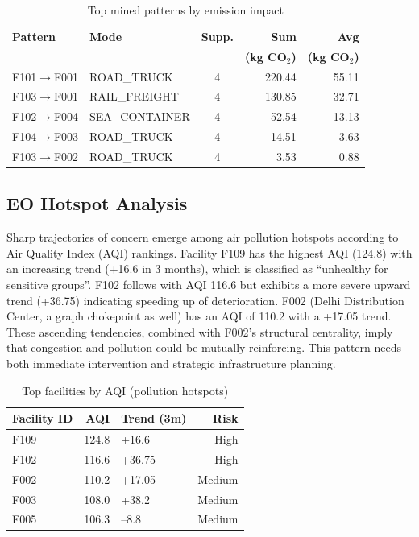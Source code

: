 \documentclass[conference]{IEEEtran}
\begin{document}
\begin{table}[!t]
\centering
\caption{Top mined patterns by emission impact}
\footnotesize
\begin{tabular}{@{}p{2.2cm}@{}p{1.8cm}@{}c@{}r@{}r@{}}
\toprule
\textbf{Pattern} & \textbf{Mode} & \textbf{Supp.} & \textbf{Sum} & \textbf{Avg} \\
&  &  & \textbf{(kg CO$_2$)} & \textbf{(kg CO$_2$)} \\
\midrule
F101$\to$F001 & ROAD\_TRUCK & 4 & 220.44 & 55.11 \\
F103$\to$F001 & RAIL\_FREIGHT & 4 & 130.85 & 32.71 \\
F102$\to$F004 & SEA\_CONTAINER & 4 & 52.54 & 13.13 \\
F104$\to$F003 & ROAD\_TRUCK & 4 & 14.51 & 3.63 \\
F103$\to$F002 & ROAD\_TRUCK & 4 & 3.53 & 0.88 \\
\bottomrule
\end{tabular}
\label{tab:prefixspan}
\end{table}

\subsection{EO Hotspot Analysis}
Sharp trajectories of concern emerge among air pollution hotspots according to Air Quality Index (AQI) rankings. Facility F109 has the highest AQI (124.8) with an increasing trend (+16.6 in 3 months), which is classified as ``unhealthy for sensitive groups''. F102 follows with AQI 116.6 but exhibits a more severe upward trend (+36.75) indicating speeding up of deterioration. F002 (Delhi Distribution Center, a graph chokepoint as well) has an AQI of 110.2 with a +17.05 trend. These ascending tendencies, combined with F002's structural centrality, imply that congestion and pollution could be mutually reinforcing. This pattern needs both immediate intervention and strategic infrastructure planning.

\begin{table}[!t]
\centering
\caption{Top facilities by AQI (pollution hotspots)}
\small
\begin{tabular}{@{}lrlr@{}}
\toprule
\textbf{Facility ID} & \textbf{AQI} & \textbf{Trend (3m)} & \textbf{Risk} \\
\midrule
F109 & 124.8 & +16.6 & High \\
F102 & 116.6 & +36.75 & High \\
F002 & 110.2 & +17.05 & Medium \\
F003 & 108.0 & +38.2 & Medium \\
F005 & 106.3 & --8.8 & Medium \\
\bottomrule
\end{tabular}
\label{tab:eo}
\end{table}
\end{document}
